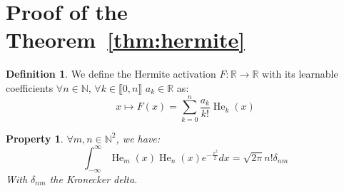 \documentclass{article} %
\theoremstyle{plain}
\newtheorem{property}[theorem]{Property}
\theoremstyle{definition}
\newtheorem{definition}[theorem]{Definition}
\theoremstyle{remark}
\begin{document}
\section{Proof of the Theorem~\ref{thm:hermite}}
\label{appendix:hermite}
\begin{definition}
\label{def:hermite}
We define the Hermite activation $F \colon \mathbb{R}\to\mathbb{R}$ with its learnable coefficients $\forall n \in \mathbb{N}$, $\forall k \in \llbracket 0, n \rrbracket$ $a_k \in \mathbb{R}$ as:
\begin{equation}
     x \mapsto F(x)=\sum^{n}_{k=0} \frac{a_k}{k!}\operatorname{He}_k(x)
\end{equation}
\end{definition} 
\begin{property}
$\forall m,n \in \mathbb{N}^2$, we have:
\begin{equation}
    \int_{-\infty}^{\infty} \operatorname{He}_m(x) \operatorname{He}_n(x) e^{-\frac{x^2}{2}} d x=\sqrt{2 \pi} n!\delta_{n m}
\end{equation}
With $\delta_{nm}$ the Kronecker delta.
\label{property:orthonormal}
\end{property}
\end{document}
